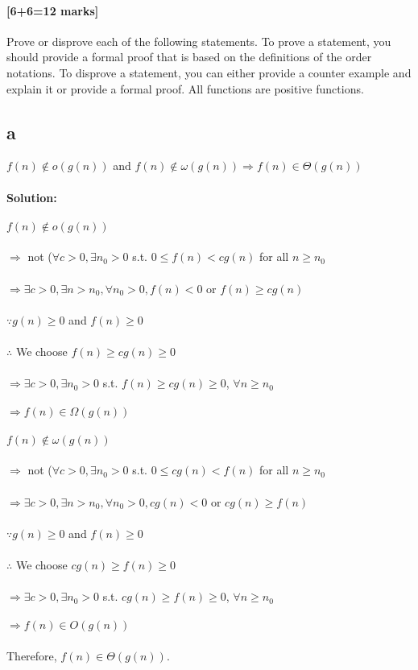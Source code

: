 \documentclass[12pt]{article}
\begin{document}
\subsection{[6+6=12 marks]}
Prove or disprove each of the following statements.  To prove a
statement, you should provide a formal proof that is based on the
definitions of the order notations.  To disprove a statement, you can
either provide a counter example and explain it or provide a formal proof.
All functions are positive functions.
\begin{itemize}
\part{a} $f(n) \not \in o(g(n))$ and $f(n) \not \in \omega(g(n))
\Rightarrow f(n) \in \Theta(g(n))$
\\
\\\textbf{Solution:}
\\
\\$f(n) \not \in o(g(n))$
\\
\\$\Rightarrow$ not ($\forall c > 0, \exists n_0 > 0$ s.t. $0 \leq f(n) < cg(n)$ for all $n \geq n_0$
\\
\\$\Rightarrow \exists c > 0, \exists n > n_0, \forall n_0 > 0, f(n) < 0$ or $f(n) \geq cg(n)$
\\
\\$\because g(n) \geq 0$ and $f(n) \geq 0$
\\
\\$\therefore$ We choose $f(n) \geq cg(n) \geq 0$
\\
\\$\Rightarrow \exists c > 0, \exists n_0 > 0$ s.t. $f(n) \geq cg(n) \geq 0$,  $\forall n \geq n_0$
\\
\\$\Rightarrow f(n) \in \Omega(g(n))$
\\
\\$f(n) \not \in \omega(g(n))$
\\
\\$\Rightarrow$ not ($\forall c > 0, \exists n_0 > 0$ s.t. $0 \leq cg(n) < f(n)$ for all $n \geq n_0$
\\
\\$\Rightarrow \exists c > 0, \exists n > n_0, \forall n_0 > 0, cg(n) < 0$ or $cg(n) \geq f(n)$
\\
\\$\because g(n) \geq 0$ and $f(n) \geq 0$
\\
\\$\therefore$ We choose $cg(n) \geq f(n) \geq 0$
\\
\\$\Rightarrow \exists c > 0, \exists n_0 > 0$ s.t. $cg(n) \geq f(n) \geq 0$,  $\forall n \geq n_0$
\\
\\$\Rightarrow f(n) \in O(g(n))$
\\
\\Therefore, $f(n) \in \Theta(g(n))$.

\end{itemize}
\end{document}
